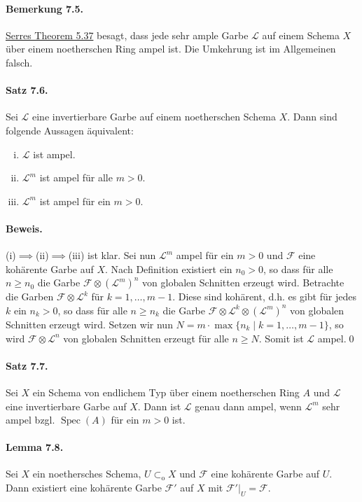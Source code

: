 \paragraph{Bemerkung 7.5.}\label{7.5} \hyperref[5.37]{Serres Theorem 5.37} besagt, dass jede sehr ample Garbe $\mathcal{L}$ auf einem Schema $X$ über einem noetherschen Ring ampel ist. Die Umkehrung ist im Allgemeinen falsch.

\paragraph{Satz 7.6.}\label{7.6} Sei $\mathcal{L}$ eine invertierbare Garbe auf einem noetherschen Schema $X$. Dann sind folgende Aussagen äquivalent:
\begin{enumerate}[(i)]
\item $\mathcal{L}$ ist ampel.
\item $\mathcal{L}^m$ ist ampel für alle $m>0$.
\item $\mathcal{L}^m$ ist ampel für ein $m>0$.
\end{enumerate}

\paragraph{Beweis.} (i)$\implies$(ii)$\implies$(iii) ist klar. Sei nun $\mathcal{L}^m$ ampel für ein $m>0$ und $\mathcal{F}$ eine kohärente Garbe auf $X$. Nach Definition existiert ein $n_0>0$, so dass für alle $n\geq n_0$ die Garbe $\mathcal{F}\otimes(\mathcal{L}^m)^n$ von globalen Schnitten erzeugt wird. Betrachte die Garben $\mathcal{F}\otimes\mathcal{L}^k$ für $k=1,\ldots,m-1$. Diese sind kohärent, d.h. es gibt für jedes $k$ ein $n_k>0$, so dass für alle $n\geq n_k$ die Garbe $\mathcal{F}\otimes\mathcal{L}^k\otimes(\mathcal{L}^m)^n$ von globalen Schnitten erzeugt wird. Setzen wir nun $N=m\cdot\max\{n_k\mid k=1,\ldots,m-1\}$, so wird $\mathcal{F}\otimes\mathcal{L}^n$ von globalen Schnitten erzeugt für alle $n\geq N$. Somit ist $\mathcal{L}$ ampel.\qed

\paragraph{Satz 7.7.}\label{7.7} Sei $X$ ein Schema von endlichem Typ über einem noetherschen Ring $A$ und $\mathcal{L}$ eine invertierbare Garbe auf $X$. Dann ist $\mathcal{L}$ genau dann ampel, wenn $\mathcal{L}^m$ sehr ampel bzgl. $\operatorname{Spec}(A)$ für ein $m>0$ ist.

\paragraph{Lemma 7.8.}\label{7.8} Sei $X$ ein noethersches Schema, $U\subset_\text{o}X$ und $\mathcal{F}$ eine kohärente Garbe auf $U$. Dann existiert eine kohärente Garbe $\mathcal{F}'$ auf $X$ mit $\mathcal{F}'|_U=\mathcal{F}$.

